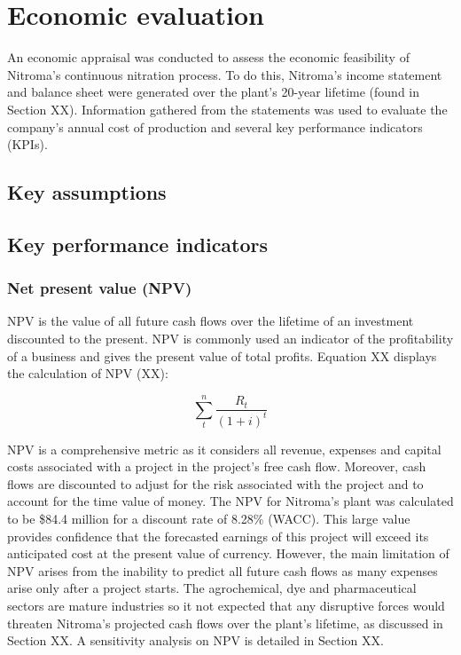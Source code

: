 \section{Economic evaluation}
An economic appraisal was conducted to assess the economic feasibility of Nitroma’s continuous nitration process. To do this, Nitroma’s income statement and balance sheet were generated over the plant’s 20-year lifetime (found in Section XX). Information gathered from the statements was used to evaluate the company’s annual cost of production and several key performance indicators (KPIs).

\subsection{Key assumptions}

\subsection{Key performance indicators}

\subsubsection{Net present value (NPV)}
NPV is the value of all future cash flows over the lifetime of an investment discounted to the present. NPV is commonly used an indicator of the profitability of a business and gives the present value of total profits. Equation XX displays the calculation of NPV (XX):

\begin{equation}
\label{eqn:npv}
    \sum_t^n\frac{R_{t}}{(1+i)^{t}}
\end{equation}

NPV is a comprehensive metric as it considers all revenue, expenses and capital costs associated with a project in the project’s free cash flow. Moreover, cash flows are discounted to adjust for the risk associated with the project and to account for the time value of money. The NPV for Nitroma’s plant was calculated to be \$84.4 million for a discount rate of 8.28\% (WACC). This large value provides confidence that the forecasted earnings of this project will exceed its anticipated cost at the present value of currency. However, the main limitation of NPV arises from the inability to predict all future cash flows as many expenses arise only after a project starts. The agrochemical, dye and pharmaceutical sectors are mature industries so it not expected that any disruptive forces would threaten Nitroma’s projected cash flows over the plant’s lifetime, as discussed in Section XX. A sensitivity analysis on NPV is detailed in Section XX. 

